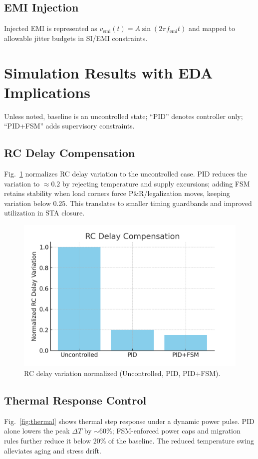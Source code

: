 \documentclass[conference]{IEEEtran}
\begin{document}
\subsection{EMI Injection}
Injected EMI is represented as $v_{\mathrm{emi}}(t)=A\sin (2\pi f_{\mathrm{emi}} t)$ and mapped to allowable jitter budgets in SI/EMI constraints.

\section{Simulation Results with EDA Implications}
Unless noted, baseline is an uncontrolled state; ``PID'' denotes controller only; ``PID+FSM'' adds supervisory constraints.

\subsection{RC Delay Compensation}
Fig.~\ref{fig:rc} normalizes RC delay variation to the uncontrolled case. PID reduces the variation to $\approx 0.2$ by rejecting temperature and supply excursions; adding FSM retains stability when load corners force P\&R/legalization moves, keeping variation below $0.25$. This translates to smaller timing guardbands and improved utilization in STA closure.

\begin{figure}[t]
\centering
\includegraphics[width=0.95\linewidth]{figs/sim_delay_rc.png}
\caption{RC delay variation normalized (Uncontrolled, PID, PID+FSM).}
\label{fig:rc}
\end{figure}

\subsection{Thermal Response Control}
Fig.~\ref{fig:thermal} shows thermal step response under a dynamic power pulse. PID alone lowers the peak $\Delta T$ by $\sim\!60\%$; FSM-enforced power caps and migration rules further reduce it below $20\%$ of the baseline. The reduced temperature swing alleviates aging and stress drift.
\end{document}
